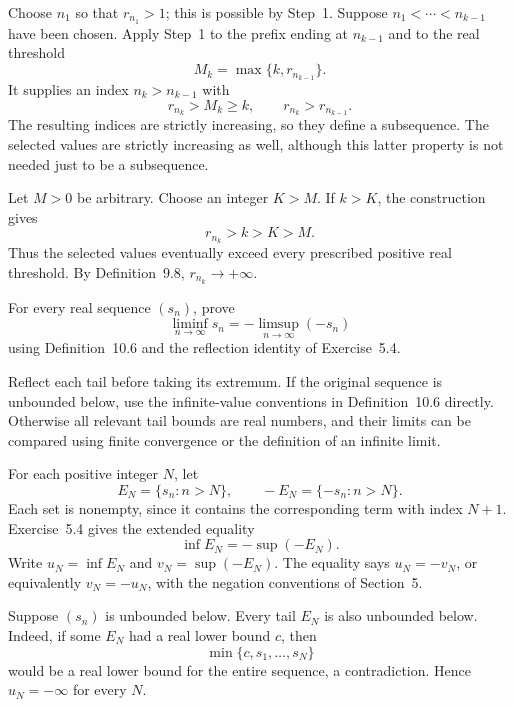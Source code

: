 Choose $n_1$ so that $r_{n_1}>1$; this is possible by Step~1.
Suppose $n_1<\cdots<n_{k-1}$ have been chosen.
Apply Step~1 to the prefix ending at $n_{k-1}$ and to the real
threshold
\[
 M_k=\max\{k,r_{n_{k-1}}\}.
\]
It supplies an index $n_k>n_{k-1}$ with
\[
 r_{n_k}>M_k\ge k,
 \qquad r_{n_k}>r_{n_{k-1}}.
\]
The resulting indices are strictly increasing, so they define a
subsequence. The selected values are strictly increasing as well,
although this latter property is not needed just to be a subsequence.

Let $M>0$ be arbitrary. Choose an integer $K>M$.
If $k>K$, the construction gives
\[
 r_{n_k}>k>K>M.
\]
Thus the selected values eventually exceed every prescribed positive
real threshold. By Definition~9.8, $r_{n_k}\to+\infty$.


\goal For every real sequence $(s_n)$, prove
\[
 \liminf_{n\to\infty}s_n
 =-\limsup_{n\to\infty}(-s_n)
\]
using Definition~10.6 and the reflection identity of Exercise~5.4.

\idea Reflect each tail before taking its extremum.
If the original sequence is unbounded below, use the infinite-value
conventions in Definition~10.6 directly. Otherwise all relevant tail
bounds are real numbers, and their limits can be compared using
finite convergence or the definition of an infinite limit.

For each positive integer $N$, let
\[
 E_N=\{s_n:n>N\},\qquad
 -E_N=\{-s_n:n>N\}.
\]
Each set is nonempty, since it contains the corresponding term
with index $N+1$. Exercise~5.4 gives the extended equality
\[
 \inf E_N=-\sup(-E_N).
\]
Write $u_N=\inf E_N$ and $v_N=\sup(-E_N)$.
The equality says $u_N=-v_N$, or equivalently $v_N=-u_N$,
with the negation conventions of Section~5.

Suppose $(s_n)$ is unbounded below. Every tail $E_N$ is also
unbounded below. Indeed, if some $E_N$ had a real lower bound $c$,
then
\[
 \min\{c,s_1,\ldots,s_N\}
\]
would be a real lower bound for the entire sequence, a contradiction.
Hence $u_N=-\infty$ for every $N$.

